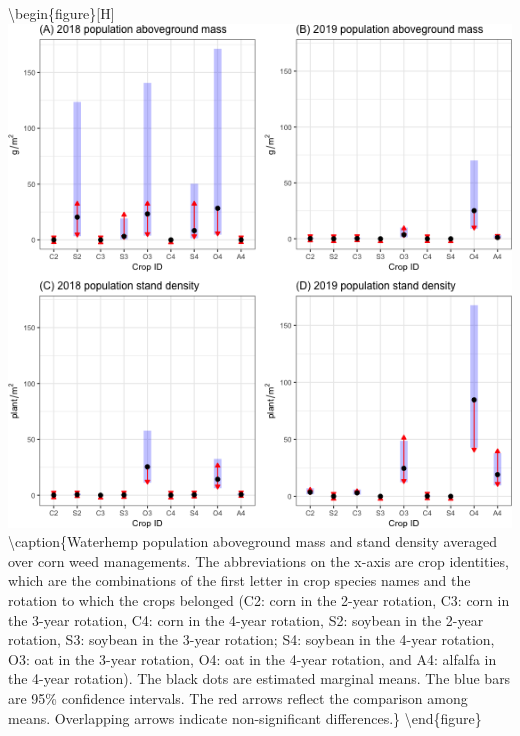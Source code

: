 \documentclass[
]{article}
\begin{document}
\textbackslash begin\{figure\}{[}H{]}
\includegraphics[width=1\linewidth]{Manuscript_whole_files/figure-latex/pop-biom-dens-all-1} \textbackslash caption\{Waterhemp population aboveground mass and stand density averaged over corn weed managements. The abbreviations on the x-axis are crop identities, which are the combinations of the first letter in crop species names and the rotation to which the crops belonged (C2: corn in the 2-year rotation, C3: corn in the 3-year rotation, C4: corn in the 4-year rotation, S2: soybean in the 2-year rotation, S3: soybean in the 3-year rotation; S4: soybean in the 4-year rotation, O3: oat in the 3-year rotation, O4: oat in the 4-year rotation, and A4: alfalfa in the 4-year rotation). The black dots are estimated marginal means. The blue bars are 95\% confidence intervals. The red arrows reflect the comparison among means. Overlapping arrows indicate non-significant differences.\}\label{fig:pop-biom-dens-all}
\textbackslash end\{figure\}
\end{document}
